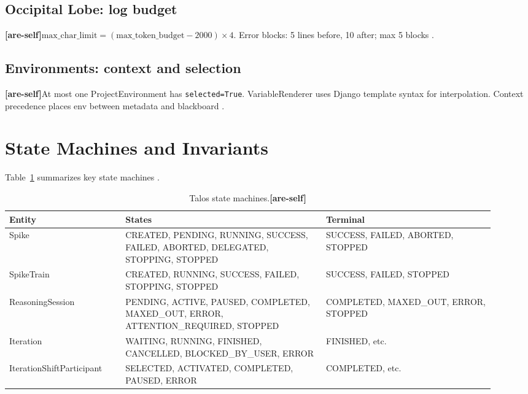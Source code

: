 \documentclass[11pt]{article}
\newcommand{\areself}{\textbf{[are-self]}}
\begin{document}
	\subsection{Occipital Lobe: log budget}
	\areself $\text{max\_char\_limit} = (\text{max\_token\_budget} - 2000) \times 4$. Error blocks: 5 lines before, 10 after; max 5 blocks \cite{talosOccipital,talosCombined}.
	
	\subsection{Environments: context and selection}
	\areself At most one ProjectEnvironment has \texttt{selected=True}. VariableRenderer uses Django template syntax for interpolation. Context precedence places env between metadata and blackboard \cite{talosEnvironments}.
	
	\section{State Machines and Invariants}
	\label{are-self:invariants}
	Table~\ref{tab:state-machines} summarizes key state machines \cite{talosCombined}.
	
	\begin{table}[t]
		\centering
		\caption{Talos state machines.\areself}
		\label{tab:state-machines}
		\small
		\begin{tabular}{@{}p{0.22\linewidth}>{\raggedright\arraybackslash}p{0.38\linewidth}>{\raggedright\arraybackslash}p{0.32\linewidth}@{}}
			\toprule
			\textbf{Entity} & \textbf{States} & \textbf{Terminal} \\
			\midrule
			Spike & CREATED, PENDING, RUNNING, SUCCESS, FAILED, ABORTED, DELEGATED, STOPPING, STOPPED & SUCCESS, FAILED, ABORTED, STOPPED \\
			SpikeTrain & CREATED, RUNNING, SUCCESS, FAILED, STOPPING, STOPPED & SUCCESS, FAILED, STOPPED \\
			ReasoningSession & PENDING, ACTIVE, PAUSED, COMPLETED, MAXED\_OUT, ERROR, ATTENTION\_REQUIRED, STOPPED & COMPLETED, MAXED\_OUT, ERROR, STOPPED \\
			Iteration & WAITING, RUNNING, FINISHED, CANCELLED, BLOCKED\_BY\_USER, ERROR & FINISHED, etc. \\
			IterationShiftParticipant & SELECTED, ACTIVATED, COMPLETED, PAUSED, ERROR & COMPLETED, etc. \\
			\bottomrule
		\end{tabular}
	\end{table}
	
\end{document}
